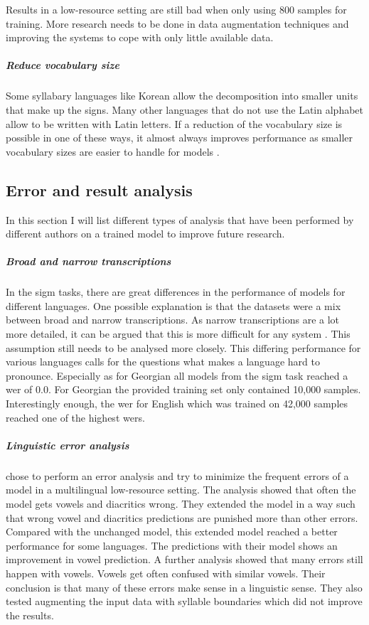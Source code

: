 Results in a low-resource setting are still bad when only using 800 samples for training. More research needs to be done in data augmentation techniques and improving the systems to cope with only little available data.

\subparagraph{Reduce vocabulary size}
Some syllabary languages like Korean allow the decomposition into smaller units that make up the signs. Many other languages that do not use the Latin alphabet allow to be written with Latin letters. If a reduction of the vocabulary size is possible in one of these ways, it almost always improves performance as smaller vocabulary sizes are easier to handle for models \citep{gorman-etal-2020-sigmorphon}. 


\subsection{Error and result analysis}
In this section I will list different types of analysis that have been performed by different authors on a trained model to improve future research.

\subparagraph{Broad and narrow transcriptions}
In the \ac{sigm} tasks, there are great differences in the performance of models for different languages. One possible explanation is that the datasets were a mix between broad and narrow transcriptions. As narrow transcriptions are a lot more detailed, it can be argued that this is more difficult for any system \citep{Ashby-Bartley.2021}. This assumption still needs to be analysed more closely. This differing performance for various languages calls for the questions what makes a language hard to pronounce. Especially as for Georgian all models from the \ac{sigm} task reached a \ac{wer} of $0.0$. For Georgian the provided training set only contained 10,000 samples. Interestingly enough, the \ac{wer} for English which was trained on 42,000 samples reached one of the highest \acp{wer}.

\subparagraph{Linguistic error analysis} \citet{lo-nicolai-2021-linguistic} chose to perform an error analysis and try to minimize the frequent errors of a model in a multilingual low-resource setting. The analysis showed that often the model gets vowels and diacritics wrong. They extended the model in a way such that wrong vowel and diacritics predictions are punished more than other errors. Compared with the unchanged model, this extended model reached a better performance for some languages. The predictions with their model shows an improvement in vowel prediction. A further analysis showed that many errors still happen with vowels. Vowels get often confused with similar vowels. Their conclusion is that many of these errors make sense in a linguistic sense. They also tested augmenting the input data with syllable boundaries which did not improve the results. 

